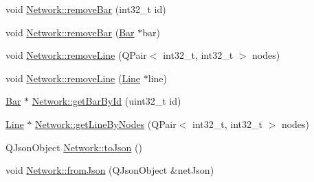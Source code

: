 \begin{DoxyCompactItemize}
void \hyperlink{group___graphics_ga997ce4f03d316b9f138f2e64e6ca400c}{Network\+::remove\+Bar} (int32\+\_\+t id)
\item 
void \hyperlink{group___graphics_ga7dea7690987c58fa61ffaa0326b68b68}{Network\+::remove\+Bar} (\hyperlink{class_bar}{Bar} $\ast$bar)
\item 
void \hyperlink{group___graphics_ga1eef3317224a7a06348fce07e581a9ad}{Network\+::remove\+Line} (Q\+Pair$<$ int32\+\_\+t, int32\+\_\+t $>$ nodes)
\item 
void \hyperlink{group___graphics_ga4fd51288aa75614593977ce8aab9100f}{Network\+::remove\+Line} (\hyperlink{class_line}{Line} $\ast$line)
\item 
\hyperlink{class_bar}{Bar} $\ast$ \hyperlink{group___graphics_ga04d524ce0fa0dd0d06deda92b1597af0}{Network\+::get\+Bar\+By\+Id} (uint32\+\_\+t id)
\item 
\hyperlink{class_line}{Line} $\ast$ \hyperlink{group___graphics_ga8f090b85a7779695cb9f05b6395b3044}{Network\+::get\+Line\+By\+Nodes} (Q\+Pair$<$ int32\+\_\+t, int32\+\_\+t $>$ nodes)
\item 
Q\+Json\+Object \hyperlink{group___graphics_ga1bb9773d3935eefef84136d388786494}{Network\+::to\+Json} ()
\item 
void \hyperlink{group___graphics_ga2aef0f6c0d9569ec4d6b948d1ef0d5f1}{Network\+::from\+Json} (Q\+Json\+Object \&net\+Json)
\end{DoxyCompactItemize}
